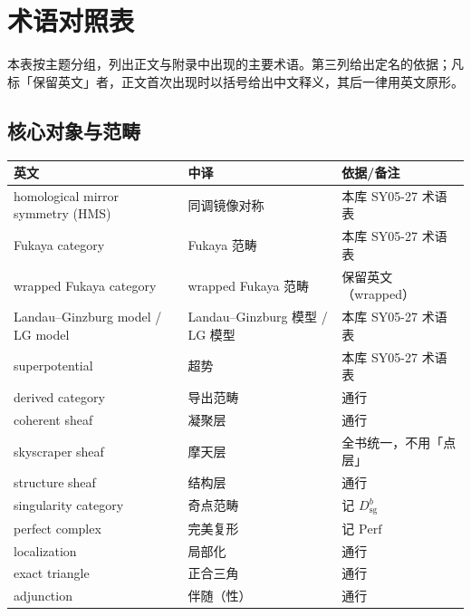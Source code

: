 \section{术语对照表}

本表按主题分组，列出正文与附录中出现的主要术语。第三列给出定名的依据；凡标「保留英文」者，正文首次出现时以括号给出中文释义，其后一律用英文原形。

\subsection*{核心对象与范畴}
\begin{longtable}{p{}p{}p{}}
\toprule
英文 & 中译 & 依据/备注\\
\midrule
\endhead
homological mirror symmetry (HMS) & 同调镜像对称 & 本库 SY05-27 术语表\\
Fukaya category & Fukaya 范畴 & 本库 SY05-27 术语表\\
wrapped Fukaya category & wrapped Fukaya 范畴 & 保留英文（wrapped）\\
Landau--Ginzburg model / LG model & Landau--Ginzburg 模型 / LG 模型 & 本库 SY05-27 术语表\\
superpotential & 超势 & 本库 SY05-27 术语表\\
derived category & 导出范畴 & 通行\\
coherent sheaf & 凝聚层 & 通行\\
skyscraper sheaf & 摩天层 & 全书统一，不用「点层」\\
structure sheaf & 结构层 & 通行\\
singularity category & 奇点范畴 & 记 $D^b_{\mathrm{sg}}$\\
perfect complex & 完美复形 & 记 $\mathrm{Perf}$\\
localization & 局部化 & 通行\\
exact triangle & 正合三角 & 通行\\
adjunction & 伴随（性） & 通行\\
\bottomrule
\end{longtable}

